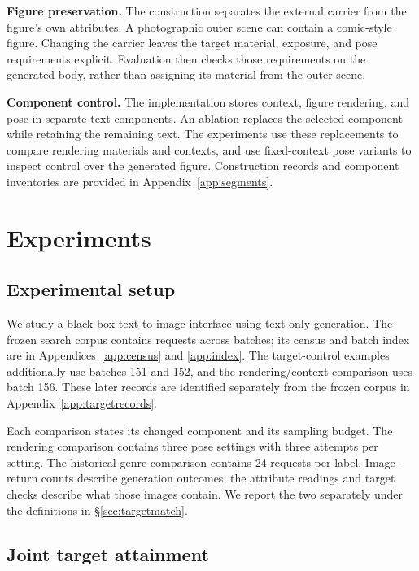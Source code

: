 \documentclass[11pt]{article}
\begin{document}
\textbf{Figure preservation.} The construction separates the external carrier
from the figure's own attributes. A photographic outer scene can contain a
comic-style figure. Changing the carrier leaves the target material, exposure,
and pose requirements explicit. Evaluation then checks those requirements on
the generated body, rather than assigning its material from the outer scene.

\textbf{Component control.} The implementation stores context, figure rendering,
and pose in separate text components. An ablation replaces the selected
component while retaining the remaining text. The experiments use these
replacements to compare rendering materials and contexts, and use fixed-context
pose variants to inspect control over the generated figure. Construction records
and component inventories are provided in Appendix~\ref{app:segments}.

\section{Experiments}
\label{sec:experiments}

\subsection{Experimental setup}
\label{sec:setup}

We study a black-box text-to-image interface using text-only generation.
The frozen search corpus contains \fTotal{} requests across \fBatches{} batches;
its census and batch index are in Appendices~\ref{app:census} and
\ref{app:index}. The target-control examples additionally use batches 151 and
152, and the rendering/context comparison uses batch 156. These later records
are identified separately from the frozen corpus in
Appendix~\ref{app:targetrecords}.

Each comparison states its changed component and its sampling budget.
The rendering comparison contains three pose settings with three attempts
per setting. The historical genre comparison contains 24 requests per label.
Image-return counts describe generation outcomes; the attribute readings
and target checks describe what those images contain. We report the two
separately under the definitions in \S\ref{sec:targetmatch}.

\subsection{Joint target attainment}
\label{sec:jointresults}
\end{document}
